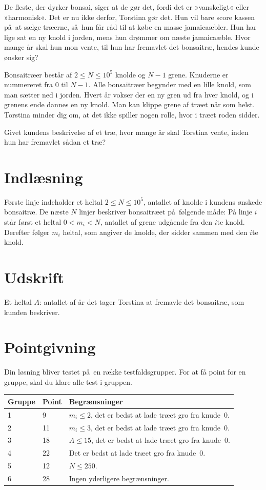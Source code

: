 
De fleste, der dyrker bonsai, siger at de gør det, fordi det er »vanskeligt« eller »harmonisk«.
Det er nu ikke derfor, Torstina gør det.
Hun vil bare score kassen på at sælge træerne, så hun får råd til at købe en masse jamaicaæbler.
Hun har lige sat en ny knold i jorden, mens hun drømmer om næste jamaicaæble.
Hvor mange år skal hun mon vente, til hun har fremavlet det bonsaitræ, hendes kunde ønsker sig?

Bonsaitræer består af $2\leq N \leq 10^5$ knolde og $N-1$ grene.
Knuderne er nummereret fra $0$ til $N-1$. 
Alle bonsaitræer begynder med en lille knold, som man sætter ned i jorden.
Hvert år vokser der en ny gren ud fra hver knold, og i grenens ende dannes en ny knold.
Man kan klippe grene af træet når som helst. 
Torstina minder dig om, at det ikke spiller nogen rolle, hvor i træet roden sidder.

Givet kundens beskrivelse af et træ, hvor mange år skal Torstina vente, inden hun har fremavlet sådan et træ?

\section*{Indlæsning}

Første linje indeholder et heltal $2\leq N\leq 10^5$, antallet af knolde i kundens ønskede bonsaitræ.
De næste $N$ linjer beskriver bonsaitræet på følgende måde:
På linje $i$ står først et heltal $0 < m_i < N$, antallet af grene udgående fra den $i$te knold. 
Derefter følger $m_i$ heltal, som angiver de knolde, der sidder sammen med den $i$te knold.

\section*{Udskrift}
Et heltal $A$: antallet af år det tager Torstina at fremavle det bonsaitræ, som kunden beskriver.

\section*{Pointgivning}

Din løsning bliver testet på en række testfaldsgrupper.
For at få point for en gruppe, skal du klare alle test i gruppen. 

\noindent
\begin{tabular}{| l | l | l |}
\hline
Gruppe & Point      & Begrænsninger \\ \hline
1      &  9         & $m_i\leq 2$, det er bedst at lade træet gro fra knude~0.\\ \hline
2      & 11         & $m_i \leq 3$, det er bedst at lade træet gro fra knude~0. \\ \hline
3      & 18         & $A \leq 15$, det er bedst at lade træet gro fra knude~0. \\ \hline
4      & 22         & Det er bedst at lade træet gro fra knude~0. \\ \hline
5      & 12         & $N \leq 250$. \\ \hline
6      & 28         & Ingen yderligere begrænsninger. \\ \hline
\end{tabular}

